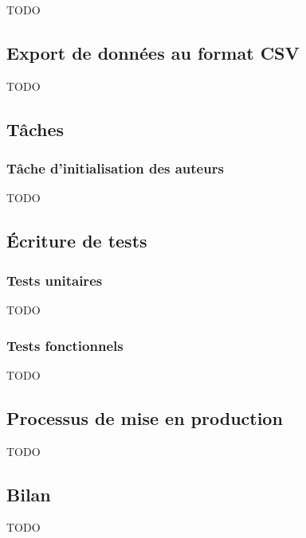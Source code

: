 TODO





\subsection{Export de données au format CSV}

TODO



\subsection{Tâches}

\subsubsection{Tâche d'initialisation des auteurs}

TODO

\subsection{Écriture de tests}

\subsubsection{Tests unitaires}

TODO

\subsubsection{Tests fonctionnels}

TODO

\subsection{Processus de mise en production}

TODO

\subsection{Bilan}

TODO
